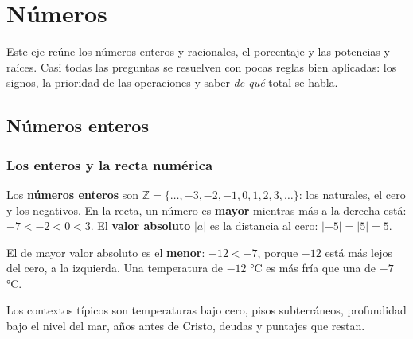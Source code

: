 \chapter{Números}

Este eje reúne los números enteros y racionales, el porcentaje y las potencias y raíces. Casi todas las preguntas se resuelven con pocas reglas bien aplicadas: los signos, la prioridad de las operaciones y saber \emph{de qué} total se habla.

\section{Números enteros}

\subsection{Los enteros y la recta numérica}
Los \textbf{números enteros} son $\mathbb{Z} = \{\dots,-3,-2,-1,0,1,2,3,\dots\}$: los naturales, el cero y los negativos. En la recta, un número es \textbf{mayor} mientras más a la derecha está: $-7 < -2 < 0 < 3$. El \textbf{valor absoluto} $|a|$ es la distancia al cero: $|-5| = |5| = 5$.

\begin{center}
\end{center}

\begin{ojo} El de mayor valor absoluto es el \textbf{menor}: $-12 < -7$, porque $-12$ está más lejos del cero, a la izquierda. Una temperatura de $-12$ °C es más fría que una de $-7$ °C.\end{ojo}

Los contextos típicos son temperaturas bajo cero, pisos subterráneos, profundidad bajo el nivel del mar, años antes de Cristo, deudas y puntajes que restan.

